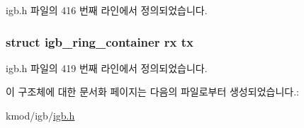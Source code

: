 igb.\+h 파일의 416 번째 라인에서 정의되었습니다.

\subsubsection[{\texorpdfstring{tx}{tx}}]{\setlength{\rightskip}{0pt plus 5cm}struct {\bf igb\+\_\+ring\+\_\+container} rx tx}\hypertarget{structigb__q__vector_aaec316360e83de6c7ecc366226b7125d}{}\label{structigb__q__vector_aaec316360e83de6c7ecc366226b7125d}


igb.\+h 파일의 419 번째 라인에서 정의되었습니다.



이 구조체에 대한 문서화 페이지는 다음의 파일로부터 생성되었습니다.\+:\begin{DoxyCompactItemize}
\item 
kmod/igb/\hyperlink{kmod_2igb_2igb_8h}{igb.\+h}\end{DoxyCompactItemize}
